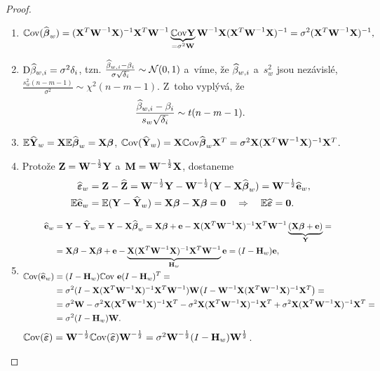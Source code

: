 \begin{theorem}
\begin{proof}
	\begin{enumerate}[1)]
		\item $$ \Cov (\wbetab_w) = \inv{(\X^T\inv{\Wm}\X)}\X^T\inv{\Wm}\underbrace{\Cov \Y}_{ = \sigma^2\Wm}\inv{\Wm}\X\inv{(\X^T\inv{\Wm}\X)} = \sigma^2\inv{(\X^T\inv{\Wm}\X)}, $$
		\item $\D \wbeta_{w,i} = \sigma^2\delta_i$, tzn. $\frac{\wbeta_{w,i}-\beta_i}{\sigma\sqrt{\delta_i}}\sim\NN(0,1)$ a~víme, že $\wbeta_{w,i}$ a~$s_w^2$ jsou nezávislé, $\frac{s_w^2(n-m-1)}{\sigma^2}\sim\chi^2(n-m-1)$. Z~toho vyplývá, že
		 $$ \frac{\wbeta_{w,i}-\beta_i}{s_w\sqrt{\delta_i}}\sim t(n-m-1). $$
		\item $\E \widehat{\Y}_w = \X\E \wbetab_w = \X\betab$, $\Cov(\widehat{\Y}_w) = \X\Cov\wbetab_w \X^T = \sigma^2\X\inv{(\X^T\inv{\Wm}\X)}\X^T$.
		\item Protože $\textbf{Z} = \Wm^{-\frac{1}{2}}\Y$ a~$\textbf{M} = \Wm^{-\frac{1}{2}}\X$, dostaneme
		\begin{align*}
		\widehat{\boldsymbol{\epsilon}}_w & = \textbf{Z}-\widehat{\textbf{Z}} = \Wm^{-\frac{1}{2}}\Y-\Wm^{-\frac{1}{2}}(\Y-\X\wbetab_w) = \Wm^{-\frac{1}{2}}\heb_w,\\
		\E \heb_w & = \E(\Y-\widehat{\Y}_w) = \X\betab-\X\betab = \nula\quad\Rightarrow\quad \E \widehat{\boldsymbol{\epsilon}} = \nula.
		\end{align*}
		\item \[
		\begin{split}
		\heb_w& = \Y-\widehat{\Y}_w = \Y-\X\wbetab_w = \X\betab+\eb-\X\inv{(\X^T\inv{\Wm}\X)}\X^T\inv{\Wm}\underbrace{(\X\betab+\eb)}_{\Y} = \\& = \X\betab-\X\betab+\eb-\underbrace{\X\inv{(\X^T\inv{\Wm}\X)}\X^T\inv{\Wm}}_{\Hm_w}\eb = (I-\Hm_w)\eb,\\
		\Cov(\heb_w)& = (I-\Hm_w)\Cov~\eb(I-\Hm_w)^T = \\& = \sigma^2(I-\X\inv{(\X^T\inv{\Wm}\X)}\X^T\inv{\Wm})\Wm\big(I-\inv{\Wm}\X\inv{(\X^T\inv{\Wm}\X)}\X^T\big) = \\& = \sigma^2\Wm-\sigma^2\X\inv{(\X^T\inv{\Wm}\X)}\X^T-\sigma^2\X\inv{(\X^T\inv{\Wm}\X)}\X^T
+\sigma^2\X\inv{(\X^T\inv{\Wm}\X)}\X^T = \\& = \sigma^2(I-\Hm_w)\Wm.	\end{split}
		\]
		 $\Cov(\widehat{\boldsymbol{\epsilon}}) = \Wm^{-\frac{1}{2}}\Cov(\widehat{\boldsymbol{\epsilon}})\Wm^{-\frac{1}{2}} = \sigma^2\Wm^{-\frac{1}{2}}(I-\Hm_w)\Wm^{\frac{1}{2}}$.
	\end{enumerate}
\end{proof}
\end{theorem}

